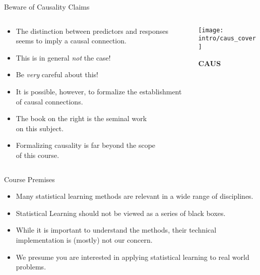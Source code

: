 \documentclass[mathserif, aspectratio=169]{beamer}
\begin{document}
\begin{frame}{Beware of Causality Claims}
	\begin{columns}
		\begin{column}{0.6\textwidth}
			\begin{itemize}
				\item The distinction between predictors and responses seems to imply a causal connection.  
				\item This is in general \emph{not} the case!
				\item Be \emph{very} careful about this!
				\item It is possible, however, to formalize the establishment of causal connections.
				\item The book on the right is the seminal work\\ on this subject.
				\item Formalizing causality is far beyond the scope\\ of this course.
			\end{itemize}
		\end{column}
		\begin{column}{0.4\textwidth}
			\begin{center}
				\texttt{[image: intro/caus\_cover]}
			\end{center}
			\begin{center}
				{\bfseries\blue CAUS}
			\end{center}
		\end{column}
	\end{columns}
\end{frame}

\begin{frame}{Course Premises}
	\begin{center}
		\begin{minipage}[t]{0.8\textwidth}
			\begin{itemize}
				\item Many statistical learning methods are relevant in a wide range of disciplines.
				\item Statistical Learning should not be viewed as a series of black boxes.
				\item While it is important to understand the methods, their technical implementation 
					is (mostly) not our concern.
				\item We presume you are interested in applying statistical learning to real world problems.
			\end{itemize}
		\end{minipage}
	\end{center}
\end{frame}
\end{document}
